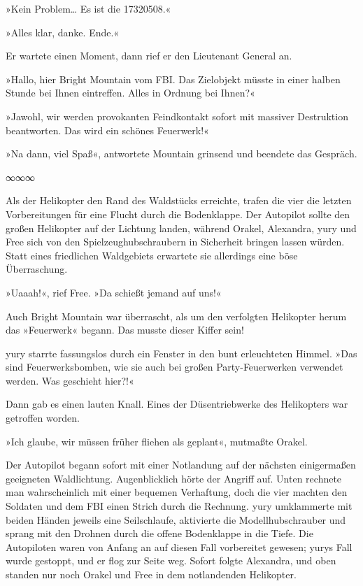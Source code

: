 »Kein Problem… Es ist die 17320508.«

»Alles klar, danke. Ende.«

Er wartete einen Moment, dann rief er den Lieutenant General an.

»Hallo, hier Bright Mountain vom FBI. Das Zielobjekt müsste in einer halben Stunde bei Ihnen eintreffen. Alles in Ordnung bei Ihnen?«

»Jawohl, wir werden provokanten Feindkontakt sofort mit massiver Destruktion beantworten. Das wird ein schönes Feuerwerk!«

»Na dann, viel Spaß«, antwortete Mountain grinsend und beendete das Gespräch.

\begin{center}
    ∞∞∞
\end{center}

Als der Helikopter den Rand des Waldstücks erreichte, trafen die vier die letzten Vorbereitungen für eine Flucht durch die Bodenklappe. Der Autopilot sollte den großen Helikopter auf der Lichtung landen, während Orakel, Alexandra, yury und Free sich von den Spielzeughubschraubern in Sicherheit bringen lassen würden. Statt eines friedlichen Waldgebiets erwartete sie allerdings eine böse Überraschung.

»Uaaah!«, rief Free. »Da schießt jemand auf uns!«

Auch Bright Mountain war überrascht, als um den verfolgten Helikopter herum das »Feuerwerk« begann. Das musste dieser Kiffer sein!

yury starrte fassungslos durch ein Fenster in den bunt erleuchteten Himmel. »Das sind Feuerwerksbomben, wie sie auch bei großen Party-Feuerwerken verwendet werden. Was geschieht hier?!«

Dann gab es einen lauten Knall. Eines der Düsentriebwerke des Helikopters war getroffen worden.

»Ich glaube, wir müssen früher fliehen als geplant«, mutmaßte Orakel.

Der Autopilot begann sofort mit einer Notlandung auf der nächsten einigermaßen geeigneten Waldlichtung. Augenblicklich hörte der Angriff auf. Unten rechnete man wahrscheinlich mit einer bequemen Verhaftung, doch die vier machten den Soldaten und dem FBI einen Strich durch die Rechnung. yury umklammerte mit beiden Händen jeweils eine Seilschlaufe, aktivierte die Modellhubschrauber und sprang mit den Drohnen durch die offene Bodenklappe in die Tiefe. Die Autopiloten waren von Anfang an auf diesen Fall vorbereitet gewesen; yurys Fall wurde gestoppt, und er flog zur Seite weg. Sofort folgte Alexandra, und oben standen nur noch Orakel und Free in dem notlandenden Helikopter.

